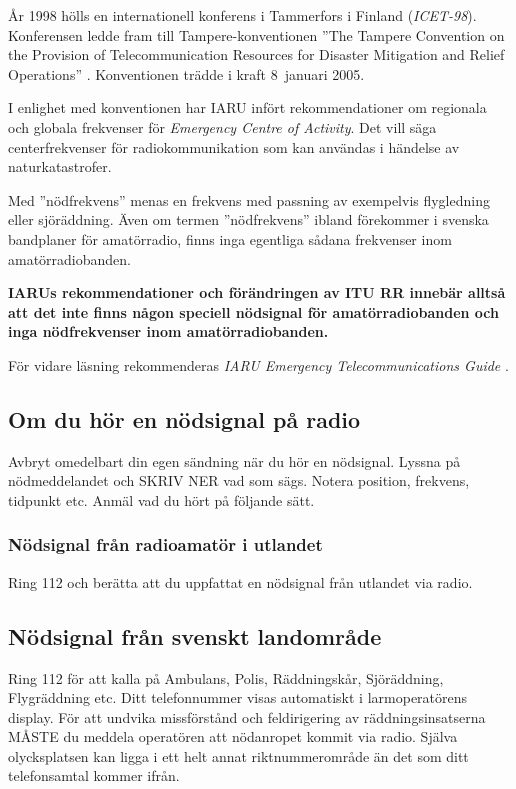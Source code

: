 År 1998 hölls en internationell konferens i Tammerfors i Finland
(\emph{ICET-98}).
Konferensen ledde fram till Tampere-konventionen ''The Tampere Convention on
the Provision of Telecommunication Resources for Disaster Mitigation and Relief
Operations'' \cite{TampereConvention}.
Konventionen trädde i kraft 8~januari 2005.

I enlighet med konventionen har IARU infört rekommendationer om regionala och
globala frekvenser för \emph{Emergency Centre of Activity}.
Det vill säga centerfrekvenser för radiokommunikation som kan användas i
händelse av naturkatastrofer.

Med ''nödfrekvens'' menas en frekvens med passning av exempelvis flygledning
eller sjöräddning.
Även om termen ''nödfrekvens'' ibland förekommer i svenska bandplaner för
amatörradio, finns inga egentliga sådana frekvenser inom amatörradiobanden.

\textbf{IARUs rekommendationer och förändringen av ITU RR innebär alltså att
  det inte finns någon speciell nödsignal för amatörradiobanden och inga
  nödfrekvenser inom amatörradiobanden.}

För vidare läsning rekommenderas
\emph{IARU Emergency Telecommunications Guide} \cite{IARU-ETG}.

\subsection{Om du hör en nödsignal på radio}

Avbryt omedelbart din egen sändning när du hör en nödsignal. Lyssna på
nödmeddelandet och SKRIV NER vad som sägs. Notera position, frekvens, tidpunkt
etc. Anmäl vad du hört på följande sätt.

\subsubsection{Nödsignal från radioamatör i utlandet}

Ring 112 och berätta att du uppfattat en nödsignal från utlandet via radio.

\subsection{Nödsignal från svenskt landområde}

Ring 112 för att kalla på Ambulans, Polis, Räddningskår, Sjöräddning,
Flygräddning etc.
Ditt telefonnummer visas automatiskt i larmoperatörens display.
För att undvika missförstånd och feldirigering av räddningsinsatserna MÅSTE du
meddela operatören att nödanropet kommit via radio.
Själva olycksplatsen kan ligga i ett helt annat riktnummerområde än det som ditt
telefonsamtal kommer ifrån.

